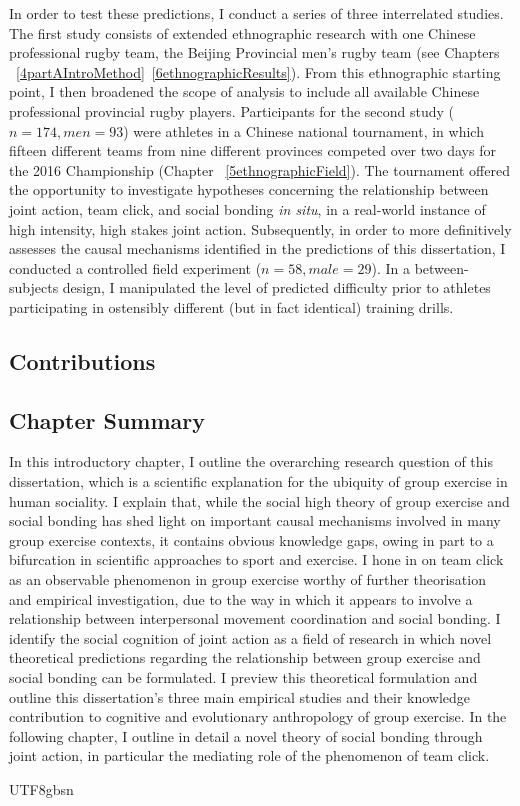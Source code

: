 \begin{CJK}{UTF8}{gbsn}
In order to test these predictions, I conduct a series of three interrelated studies.  The first study consists of extended ethnographic research with one Chinese professional rugby team, the Beijing Provincial men's rugby team (see Chapters ~\ref{4partAIntroMethod}\nobreakdash~\ref{6ethnographicResults}). From this ethnographic starting point, I then broadened the scope of analysis to include all available Chinese professional provincial rugby players. Participants for the second study ($n = 174, men = 93$) were athletes in a Chinese national tournament, in which fifteen different teams from nine different provinces competed over two days for the 2016 Championship (Chapter ~\ref{5ethnographicField}).  The tournament offered the opportunity to investigate hypotheses concerning the relationship between joint action, team click, and social bonding \textit{in situ}, in a real-world instance of high intensity, high stakes joint action.  Subsequently, in order to more definitively assesses the causal mechanisms identified in the predictions of this dissertation, I conducted a controlled field experiment ($n = 58, male = 29$). In a between-subjects design, I manipulated the level of predicted difficulty prior to athletes participating in ostensibly different (but in fact identical) training drills.

\subsection{Contributions}




\subsection{Chapter Summary}
In this introductory chapter, I outline the overarching research question of this dissertation, which is a scientific explanation for the ubiquity of group exercise in human sociality.  I explain that, while the social high theory of group exercise and social bonding has shed light on important causal mechanisms involved in many group exercise contexts, it contains obvious knowledge gaps, owing in part to a bifurcation in scientific approaches to sport and exercise.  I hone in on team click as an observable phenomenon in group exercise worthy of further theorisation and empirical investigation, due to the way in which it appears to involve a relationship between interpersonal movement coordination and social bonding.  I identify the social cognition of joint action as a field of research in which novel theoretical predictions regarding the relationship between group exercise and social bonding can be formulated.  I preview this theoretical formulation and outline this dissertation's three main empirical studies and their knowledge contribution to cognitive and evolutionary anthropology of group exercise.  In the following chapter, I outline in detail a novel theory of social bonding through joint action, in particular the mediating role of the phenomenon of team click.




                                              \end{CJK}{UTF8}{gbsn}

